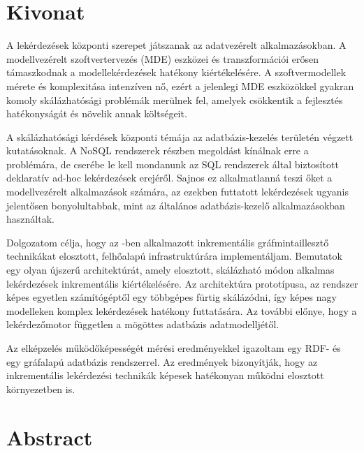 \chapter*{Kivonat}

A lekérdezések központi szerepet játszanak az adatvezérelt alkalmazásokban. A modellvezérelt szoftvertervezés (MDE) eszközei és transzformációi erősen támaszkodnak a modellekérdezések hatékony kiértékelésére. A szoftvermodellek mérete és komplexitása intenzíven nő, ezért a jelenlegi MDE eszközökkel gyakran komoly skálázhatósági problémák merülnek fel, amelyek csökkentik a fejlesztés hatékonyságát és növelik annak költségeit.

A skálázhatósági kérdések központi témája az adatbázis-kezelés területén végzett kutatásoknak. A NoSQL rendszerek részben megoldást kínálnak erre a problémára, de cserébe le kell mondanunk az SQL rendszerek által biztosított deklaratív ad-hoc lekérdezések erejéről. Sajnos ez alkalmatlanná teszi őket a modellvezérelt alkalmazások számára, az ezekben futtatott lekérdezések ugyanis jelentősen bonyolultabbak, mint az általános adatbázis-kezelő alkalmazásokban használtak.

Dolgozatom célja, hogy az \eiq{}-ben alkalmazott inkrementális gráfmintaillesztő technikákat elosztott, felhőalapú infrastruktúrára implementáljam. Bemutatok egy olyan újszerű architektúrát, amely elosztott, skálázható módon alkalmas lekérdezések inkrementális kiértékelésére. Az architektúra prototípusa, az \iqd{} rendszer képes egyetlen számítógéptől egy többgépes fürtig skálázódni, így képes nagy modelleken komplex lekérdezések hatékony futtatására. Az \iqd{} további előnye, hogy a lekérdezőmotor független a mögöttes adatbázis adatmodelljétől.

Az elképzelés működőképességét mérési eredményekkel igazoltam egy RDF- és egy gráfalapú adatbázis rendszerrel. Az eredmények bizonyítják, hogy az inkrementális lekérdezési technikák képesek hatékonyan működni elosztott környezetben is. 

\vfill

\chapter*{Abstract}

